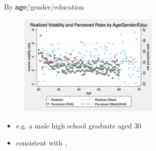 \documentclass{beamer}
\begin{document}
\begin{frame}{By \textbf{age}/gender/education}
	\label{age_compare}
	\begin{figure}[ht]
		\label{compare_by_age_gender_educ}
		\centering
		\includegraphics[width=0.60\textwidth]{figures/real_log_wage_shk_gr_by_age_edu_gender_compare.png}
	\end{figure}
	\begin{itemize}
		\item e.g. a male high school graduate aged 30  
		\hyperlink{appendix:age_gender_educ_level_compare_figure}{}
		\quad 	\hyperlink{appendix:age_gender_educ_nlevel_compare_figure}{}
				\quad  \hyperlink{appendix:age_compare_figure}{}  
		\quad  \hyperlink{appendix:age_educ_compare_figure}{}  
		\quad  \hyperlink{appendix: compare_by_cohort}{}  
		\item consistent with  \cite{moffitt2002trends}, \cite{sabelhaus2010great}
	\end{itemize}
\end{frame}
\end{document}
